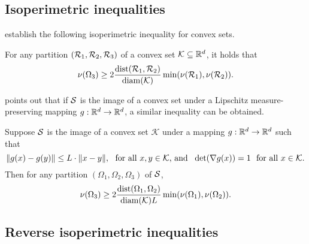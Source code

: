 \subsection{Isoperimetric inequalities}
\label{subsec:isoperimetric_inequalities}
\citet{dyer1991} establish the following isoperimetric inequality for convex sets.
\begin{lemma}
	\label{lem:convex_isoperimetric_inequality}
	For any partition $(\mathcal{R}_1,\mathcal{R}_2,\mathcal{R}_3)$ of a convex set $\mathcal{K} \subseteq \mathbb{R}^d$, it holds that
	\begin{equation*}
	\nu(\Omega_3) \geq 2\frac{\mathrm{dist}(\mathcal{R}_1, \mathcal{R}_2)}{\mathrm{diam}(\mathcal{K})} \min(\nu(\mathcal{R}_1), \nu(\mathcal{R}_2)).
	\end{equation*}
\end{lemma}
\citet{abbasi-yadkori2016a} points out that if $\mathcal{S}$ is the image of a convex set under a Lipschitz measure-preserving mapping $g: \mathbb{R}^d \to \mathbb{R}^d$, a similar inequality can be obtained.
\begin{corollary}
	\label{cor:nonconvex_isoperimetric_inequality}
	Suppose $\mathcal{S}$ is the image of a convex set $\mathcal{K}$ under a mapping $g:\mathbb{R}^d \to \mathbb{R}^d$ such that
	\begin{equation*}
	\|g(x) - g(y)\| \leq L \cdot \|x - y\|,~~\textrm{for all $x,y \in \mathcal{K}$, and}~~\det(\nabla g(x)) = 1~~\textrm{for all $x \in \mathcal{K}$.}
	\end{equation*}
	Then for any partition $(\Omega_1,\Omega_2,\Omega_3)$ of $\mathcal{S}$, 
	\begin{equation*}
	\nu(\Omega_3) \geq 2\frac{\mathrm{dist}(\Omega_1, \Omega_2)}{\mathrm{diam}(\mathcal{K}) L} \min(\nu(\Omega_1), \nu(\Omega_2)).
	\end{equation*}
\end{corollary}

\subsection{Reverse isoperimetric inequalities}
\label{subsec:reverse_isoperimetric_inequalities}

